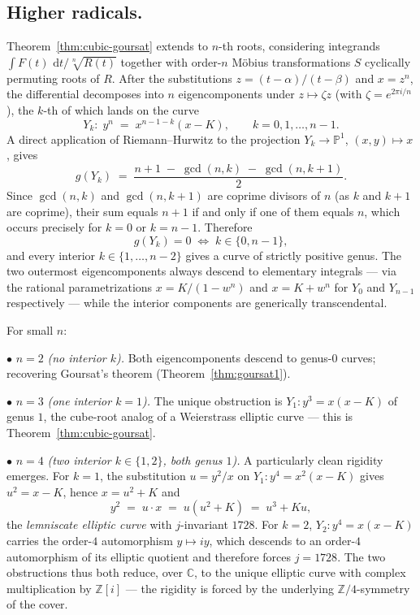 \documentclass[11pt,a4paper]{article}
\theoremstyle{plain}
\theoremstyle{definition}
\theoremstyle{remark}
\newcommand{\C}{\mathbb{C}}
\newcommand{\Z}{\mathbb{Z}}
\renewcommand{\d}{\,\mathrm{d}}
\begin{document}
\subsection*{Higher radicals.}
Theorem~\ref{thm:cubic-goursat} extends to $n$-th roots, considering integrands $\int F(t)\,\d t/\sqrt[n]{R(t)}$ together with order-$n$ M\"obius transformations $S$ cyclically permuting roots of $R$. After the substitutions $z = (t-\alpha)/(t-\beta)$ and $x = z^n$, the differential decomposes into $n$ eigencomponents under $z\mapsto\zeta z$ (with $\zeta = e^{2\pi i/n}$), the $k$-th of which lands on the curve
\[
  Y_k\colon\; y^n \;=\; x^{n-1-k}(x-K), \qquad k = 0, 1, \dots, n-1.
\]
A direct application of Riemann--Hurwitz to the projection $Y_k\to\mathbb{P}^1$, $(x,y)\mapsto x$, gives
\begin{equation}\label{eq:gen-n-genus}
  g(Y_k) \;=\; \frac{n+1\;-\;\gcd(n,k)\;-\;\gcd(n,k+1)}{2}.
\end{equation}
Since $\gcd(n,k)$ and $\gcd(n,k+1)$ are coprime divisors of $n$ (as $k$ and $k+1$ are coprime), their sum equals $n+1$ if and only if one of them equals $n$, which occurs precisely for $k = 0$ or $k = n-1$. Therefore
\[
  g(Y_k) = 0 \;\iff\; k\in\{0, n-1\},
\]
and every interior $k\in\{1,\dots,n-2\}$ gives a curve of strictly positive genus. The two outermost eigencomponents always descend to elementary integrals --- via the rational parametrizations $x = K/(1-w^n)$ and $x = K + w^n$ for $Y_0$ and $Y_{n-1}$ respectively --- while the interior components are generically transcendental.

\medskip
For small $n$:

\smallskip\noindent
$\bullet$ $\boxed{n=2}$ \emph{(no interior $k$).} Both eigencomponents descend to genus-$0$ curves; recovering Goursat's theorem (Theorem~\ref{thm:goursat1}).

\smallskip\noindent
$\bullet$ $\boxed{n=3}$ \emph{(one interior $k=1$).} The unique obstruction is $Y_1\colon y^3 = x(x-K)$ of genus $1$, the cube-root analog of a Weierstrass elliptic curve --- this is Theorem~\ref{thm:cubic-goursat}.

\smallskip\noindent
$\bullet$ $\boxed{n=4}$ \emph{(two interior $k\in\{1,2\}$, both genus $1$).} A particularly clean rigidity emerges. For $k=1$, the substitution $u = y^2/x$ on $Y_1\colon y^4 = x^2(x-K)$ gives $u^2 = x-K$, hence $x = u^2 + K$ and
\[
  y^2 \;=\; u\cdot x \;=\; u(u^2 + K) \;=\; u^3 + Ku,
\]
the \emph{lemniscate elliptic curve} with $j$-invariant $1728$. For $k=2$, $Y_2\colon y^4 = x(x-K)$ carries the order-$4$ automorphism $y\mapsto iy$, which descends to an order-$4$ automorphism of its elliptic quotient and therefore forces $j = 1728$. The two obstructions thus both reduce, over $\C$, to the unique elliptic curve with complex multiplication by $\Z[i]$ --- the rigidity is forced by the underlying $\Z/4$-symmetry of the cover.
\end{document}
